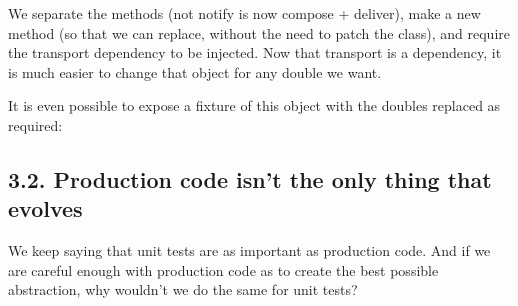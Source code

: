 \documentclass[a4paper,10pt,english]{sphinxmanual}
\begin{document}
We separate the methods (not notify is now compose + deliver),
make  a new method (so that we can replace, without the need to
patch the class), and require the transport dependency to be injected. Now that
transport is a dependency, it is much easier to change that object for any double we want.

It is even possible to expose a fixture of this object with the doubles replaced as required:

\begin{sphinxVerbatim}[commandchars=\\\{\}]
 
      
      
     

 
     
      
         
         
         

     
\end{sphinxVerbatim}


\subsection{3.2. Production code isn’t the only thing that evolves}
\label{\detokenize{chapters/8_unit_testing/index:production-code-isn-t-the-only-thing-that-evolves}}
We keep saying that unit tests are as important as production code. And if we are careful
enough with production code as to create the best possible abstraction, why wouldn’t we
do the same for unit tests?
\end{document}
